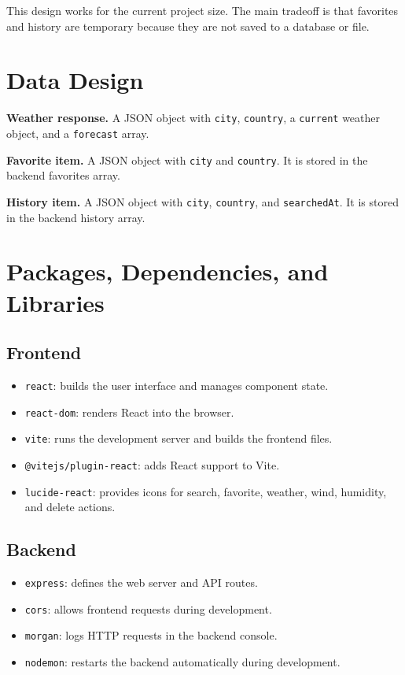 \documentclass[11pt]{article}
\begin{document}
This design works for the current project size. The main tradeoff is that favorites and history are temporary because they are not saved to a database or file.

\section{Data Design}
\textbf{Weather response.} A JSON object with \texttt{city}, \texttt{country}, a \texttt{current} weather object, and a \texttt{forecast} array.

\textbf{Favorite item.} A JSON object with \texttt{city} and \texttt{country}. It is stored in the backend favorites array.

\textbf{History item.} A JSON object with \texttt{city}, \texttt{country}, and \texttt{searchedAt}. It is stored in the backend history array.

\section{Packages, Dependencies, and Libraries}
\subsection{Frontend}
\begin{itemize}
\item \texttt{react}: builds the user interface and manages component state.
\item \texttt{react-dom}: renders React into the browser.
\item \texttt{vite}: runs the development server and builds the frontend files.
\item \texttt{@vitejs/plugin-react}: adds React support to Vite.
\item \texttt{lucide-react}: provides icons for search, favorite, weather, wind, humidity, and delete actions.
\end{itemize}

\subsection{Backend}
\begin{itemize}
\item \texttt{express}: defines the web server and API routes.
\item \texttt{cors}: allows frontend requests during development.
\item \texttt{morgan}: logs HTTP requests in the backend console.
\item \texttt{nodemon}: restarts the backend automatically during development.
\end{itemize}
\end{document}
